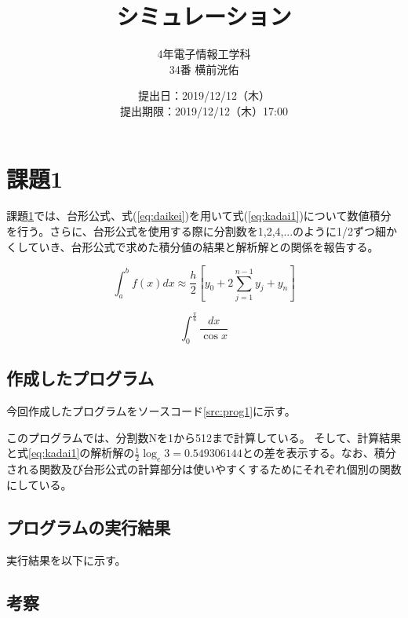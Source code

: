 \documentclass[10pt,titlepage]{jsarticle}
\title{シミュレーション}
\author{4年電子情報工学科\\34番 横前洸佑}
\date{提出日：2019/12/12（木）\\	提出期限：2019/12/12（木）17:00}
\begin{document}
\maketitle

\section{課題1}
\label{sec:kadai1}
課題\ref{sec:kadai1}では、台形公式、式(\ref{eq:daikei})を用いて式(\ref{eq:kadai1})について数値積分を行う。さらに、台形公式を使用する際に分割数を1,2,4,...のように1/2ずつ細かくしていき、台形公式で求めた積分値の結果と解析解との関係を報告する。


\begin{equation}
\label{eq:daikei}
	\int_a^b f(x) dx \approx \frac{h}{2}\left[y_0+2 \sum_{j=1}^{n-1}y_j+y_n\right]
\end{equation}


\begin{equation}
\label{eq:kadai1}
	\int_0^\frac{\pi}{6} \frac{dx}{\cos x}
\end{equation}

\subsection{作成したプログラム}
今回作成したプログラムをソースコード\ref{src:prog1}に示す。



このプログラムでは、分割数Nを1から512まで計算している。
そして、計算結果と式\ref{eq:kadai1}の解析解の$\frac{1}{2}\log_e3=0.549306144$との差を表示する。なお、積分される関数及び台形公式の計算部分は使いやすくするためにそれぞれ個別の関数にしている。

\subsection{プログラムの実行結果}
実行結果を以下に示す。
\begin{oframed}
\end{oframed}



\subsection{考察}
\end{document}
